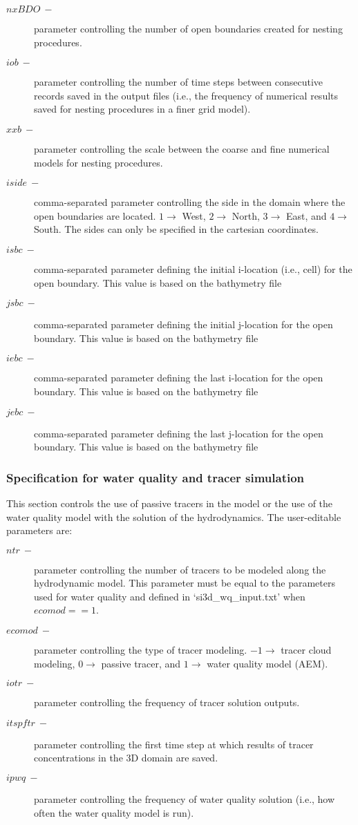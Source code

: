 \begin{description}
    \item [$nxBDO\ -$] parameter controlling the number of open boundaries created for nesting procedures.
    \item [$iob\ -$] parameter controlling the number of time steps between consecutive records saved in the output files (i.e., the frequency of numerical results saved for nesting procedures in a finer grid model).
    \item [$xxb\ -$] parameter controlling the scale between the coarse and fine numerical models for nesting procedures.
    \item [$iside\ -$] comma-separated parameter controlling the side in the domain where the open boundaries are located. $1 \rightarrow$ West, $2 \rightarrow$ North, $3 \rightarrow$ East, and $4 \rightarrow$ South. The sides can only be specified in the cartesian coordinates.
    \item [$isbc\ -$] comma-separated parameter defining the initial i-location (i.e., cell) for the open boundary. This value is based on the bathymetry file
    \item [$jsbc\ -$] comma-separated parameter defining the initial j-location for the open boundary. This value is based on the bathymetry file
    \item [$iebc\ -$] comma-separated parameter defining the last i-location for the open boundary. This value is based on the bathymetry file
    \item [$jebc\ -$] comma-separated parameter defining the last j-location for the open boundary. This value is based on the bathymetry file
\end{description}

\subsubsection{Specification for water quality and tracer simulation}
This section controls the use of passive tracers in the model or the use of the water quality model with the solution of the hydrodynamics. The user-editable parameters are: 

\begin{description}
    \item [$ntr\ -$] parameter controlling the number of tracers to be modeled along the hydrodynamic model. This parameter must be equal to the parameters used for water quality and defined in `si3d\_wq\_input.txt' when $ecomod == 1$.
    \item [$ecomod\ -$] parameter controlling the type of tracer modeling. $-1 \rightarrow$ tracer cloud modeling, $0 \rightarrow$ passive tracer, and $1 \rightarrow$ water quality model (AEM).
    \item [$iotr\ -$] parameter controlling the frequency of tracer solution outputs.
    \item [$itspftr\ -$] parameter controlling the first time step at which results of tracer concentrations in the 3D domain are saved.
    \item [$ipwq\ -$] parameter controlling the frequency of water quality solution (i.e., how often the water quality model is run).
\end{description}

